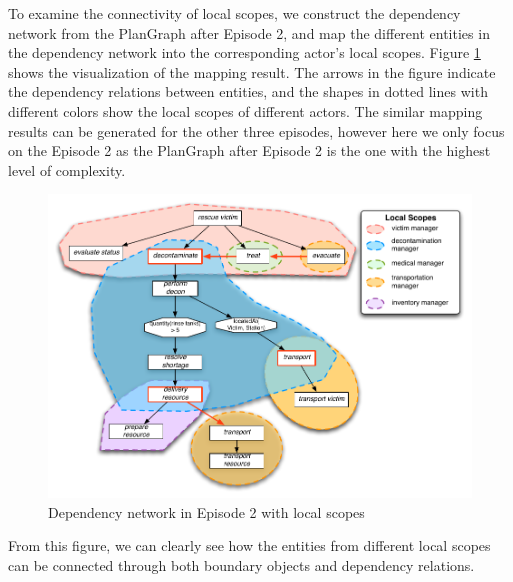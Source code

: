 To examine the connectivity of local scopes, we construct the dependency network from the PlanGraph after Episode 2, and map the different entities in the dependency network into the corresponding actor's local scopes. Figure \ref{fig:dependencies_ep2} shows the visualization of the mapping result. The arrows in the figure indicate the dependency relations between entities, and the shapes in dotted lines with different colors show the local scopes of different actors. The similar mapping results can be generated for the other three episodes, however here we only focus on the Episode 2 as the PlanGraph after Episode 2 is the one with the highest level of complexity.

\begin{figure}[htbp] %
	\centering
	\includegraphics[width=5.8in]{dependencies_ep2.pdf} 
	\caption{Dependency network in Episode 2 with local scopes}
	\label{fig:dependencies_ep2}
\end{figure}

From this figure, we can clearly see how the entities from different local scopes can be connected through both boundary objects and dependency relations. 

